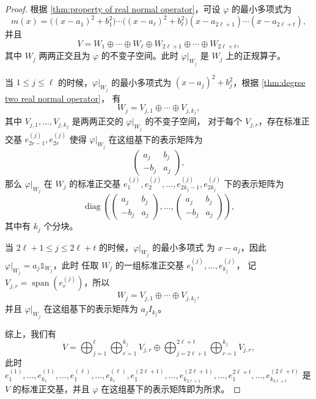 \documentclass[fontset=none,zihao=-4]{Notes}
\DeclareMathOperator\diag{diag}
\newcommand{\spa}[1]{\operatorname{span}\left(#1\right)}
\begin{document}
\begin{proof}
  根据 \autoref{thm:property of real normal operator}，可设
  $\varphi$ 的最小多项式为
  \[
    m(x)=\bigl((x-a_1)^2+b_1^2\bigr)\cdots
    \bigl((x-a_\ell)^2+b_\ell^2\bigr)(x-a_{2\ell+1})\cdots(x-a_{2\ell+t}),
  \]
  并且
  \[
    V=W_1\oplus\cdots\oplus W_\ell\oplus W_{2\ell+1}\oplus \cdots\oplus W_{2\ell+t},
  \]
  其中 $W_j$ 两两正交且为 $\varphi$ 的不变子空间。此时 $\varphi|_{W_j}$
  是 $W_j$ 上的正规算子。

  当 $1\leq j\leq \ell$ 的时候，$\varphi|_{W_j}$ 的最小多项式为
  $(x-a_{j})^2+b_j^2$，根据 \autoref{thm:degree two real normal operator}，
  有
  \[
    W_j=V_{j,1}\oplus \cdots\oplus V_{j,k_{j}} ,
  \]
  其中 $V_{j,1},\dots,V_{j,k_j}$ 是两两正交的 $\varphi|_{W_j}$ 的不变子空间，
  对于每个 $V_{j,r}$，存在标准正交基 $e_{2r-1}^{(j)},e_{2r}^{(j)}$ 使得
  $\varphi|_{W_j}$ 在这组基下的表示矩阵为
  \[
    \begin{pmatrix}
      a_j & b_j \\
      -b_j & a_j
    \end{pmatrix}  ,
  \]
  那么 $\varphi|_{W_j}$ 在 $W_j$ 的标准正交基 $e_{1}^{(j)},e_2^{(j)},\dots,e_{2k_j-1}^{(j)},e_{2k_j}^{(j)}$
  下的表示矩阵为
  \[
    \diag\left(
      \begin{pmatrix}
        a_j & b_j \\
        -b_j & a_j
      \end{pmatrix},\dots,
      \begin{pmatrix}
        a_j & b_j \\
        -b_j & a_j
      \end{pmatrix}
    \right)  ,
  \]
  其中有 $k_j$ 个分块。

  当 $2\ell+1\leq j\le 2\ell+t$ 的时候，$\varphi|_{W_j}$ 的最小多项式
  为 $x-a_{j}$，因此 $\varphi|_{W_j}=a_j\mathbb{1}_{W_j}$，此时
  任取 $W_j$ 的一组标准正交基 $e_1^{(j)},\dots,e_{k_j}^{(j)}$，
  记 $V_{j,r}=\spa{e_{r}^{(j)}}$，所以
  \[
    W_j=V_{j,1}\oplus \cdots\oplus V_{j,k_{j}} ,
  \]
  并且 $\varphi|_{W_j}$ 在这组基下的表示矩阵为 $a_jI_{k_j}$。

  综上，我们有
  \[
      V=\bigoplus_{j=1}^{\ell}\bigoplus_{r=1}^{k_j}V_{j,r}
      \oplus\bigoplus_{j=2\ell+1}^{2\ell+t}\bigoplus_{r=1}^{k_j} V_{j,r},
  \]
  此时 $e_1^{(1)},\dots,e_{k_1}^{(1)},\dots,e_{1}^{(\ell)},\dots,e_{k_{\ell}}^{(\ell)},e_{1}^{(2\ell+1)},\dots,e_{k_{2\ell+1}}^{(2\ell+1)},\dots,e_1^{2\ell+t},\dots,e_{k_{2\ell+t}}^{(2\ell+t)}$
  是 $V$ 的标准正交基，并且 $\varphi$ 在这组基下的表示矩阵即为所求。
\end{proof}
\end{document}
